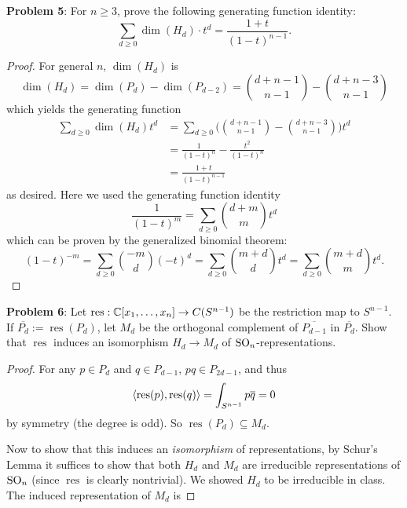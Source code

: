 \documentclass{amsart}
\DeclareMathOperator{\res}{res}
\begin{document}
	\newpage 
	\noindent \textbf{Problem 5}: For $n\geq 3$, prove the following generating function identity:
	$$
	\sum_{d\geq 0} \dim (H_d) \cdot t^d = \frac{1+t}{(1-t)^{n-1}}.
	$$
	\begin{proof}
		For general $n$, $\dim(H_d)$ is 
		$$
		\dim(H_d) = \dim(P_d) - \dim(P_{d-2}) = {d+n-1 \choose n-1} - {d + n - 3 \choose n - 1}
		$$
		which yields the generating function
		\begin{align*}
			\sum_{d\geq 0} \dim(H_d) t^d &= \sum_{d\geq 0} \bigg({d+n-1 \choose n-1} - {d + n - 3 \choose n - 1}\bigg) t^d\\
			&= \frac{1}{(1-t)^{n}} - \frac{t^2}{(1-t)^{n}} \\
			&= \frac{1+t}{(1-t)^{n-1}}
		\end{align*}
		as desired. Here we used the generating function identity
		$$
		\frac{1}{(1-t)^m} = \sum_{d\geq 0} {d + m \choose m} t^d
		$$
		which can be proven by the generalized binomial theorem:
		$$
		(1-t)^{-m} = \sum_{d\geq 0}{-m\choose d} (-t)^d = \sum_{d\geq 0} {m+d \choose d} t^d = \sum_{d\geq 0} {m+d \choose m} t^d.
		$$
	\end{proof}
	
	\newpage
	\noindent \textbf{Problem 6}: Let $\res:\C[x_1,\dots,x_n]\to C(S^{n-1})$ be the restriction map to $S^{n-1}$. If $\overline{P_d}:=\res(P_d)$, let $M_d$ be the orthogonal complement of $\overline{P_{d-1}}$ in $\overline{P_{d}}$. Show that $\res$ induces an isomorphism $H_d\to M_d$ of $\operatorname{SO}_n$-representations.
	
	\begin{proof}
		For any $p\in P_d$ and $q\in P_{d-1}$, $pq\in P_{2d-1}$, and thus 
		$$
		\<\res(p),\res(q)\> = \int_{S^{n-1}} p\overline{q}= 0
		$$
		by symmetry (the degree is odd). So $\res(P_d)\subseteq M_d$. 
		
		Now to show that this induces an \textit{isomorphism} of representations, by Schur's Lemma it suffices to show that both $H_d$ and $M_d$ are irreducible representations of $\operatorname{SO}_n$ (since $\res$ is clearly nontrivial). We showed $H_d$ to be irreducible in class. The induced representation of $M_d$ is 
		
	\end{proof}
	
\end{document}

